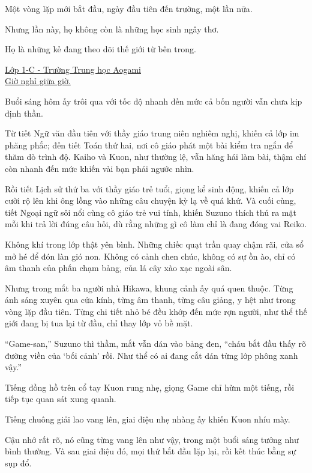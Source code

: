 \documentclass[../main.tex]{subfiles}
\begin{document}
Một vòng lặp mới bắt đầu, ngày đầu tiên đến trường, một lần nữa.

Nhưng lần này, họ không còn là những học sinh ngây thơ.

Họ là những kẻ đang theo dõi thế giới từ bên trong.

\begin{center}
  \uline{Lớp 1-C - Trường Trung học Aogami\\Giờ nghỉ giữa giờ.}
\end{center}

Buổi sáng hôm ấy trôi qua với tốc độ nhanh đến mức cả bốn người vẫn chưa kịp định thần.

Từ tiết Ngữ văn đầu tiên với thầy giáo trung niên nghiêm nghị, khiến cả lớp im phăng phắc; đến tiết Toán thứ hai, nơi cô giáo phát một bài kiểm tra ngắn để thăm dò trình độ. Kaiho và Kuon, như thường lệ, vẫn hăng hái làm bài, thậm chí còn nhanh đến mức khiến vài bạn phải ngước nhìn.

Rồi tiết Lịch sử thứ ba với thầy giáo trẻ tuổi, giọng kể sinh động, khiến cả lớp cười rộ lên khi ông lồng vào những câu chuyện kỳ lạ về quá khứ. Và cuối cùng, tiết Ngoại ngữ sôi nổi cùng cô giáo trẻ vui tính, khiến Suzuno thích thú ra mặt mỗi khi trả lời đúng câu hỏi, dù rằng những gì cô làm chỉ là đang đóng vai Reiko.

Không khí trong lớp thật yên bình. Những chiếc quạt trần quay chậm rãi, cửa sổ mở hé để đón làn gió non. Không có cảnh chen chúc, không có sự ồn ào, chỉ có âm thanh của phấn chạm bảng, của lá cây xào xạc ngoài sân.

Nhưng trong mắt ba người nhà Hikawa, khung cảnh ấy quá quen thuộc. Từng ánh sáng xuyên qua cửa kính, từng âm thanh, từng câu giảng, y hệt như trong vòng lặp đầu tiên. Từng chi tiết nhỏ bé đều khớp đến mức rợn người, như thể thế giới đang bị tua lại từ đầu, chỉ thay lớp vỏ bề mặt.

``Game-san,'' Suzuno thì thầm, mắt vẫn dán vào bảng đen, ``cháu bắt đầu thấy rõ đường viền của `bối cảnh' rồi. Như thể có ai đang cắt dán từng lớp phông xanh vậy.''

Tiếng đồng hồ trên cổ tay Kuon rung nhẹ, giọng Game chỉ hừm một tiếng, rồi tiếp tục quan sát xung quanh.

Tiếng chuông giải lao vang lên, giai điệu nhẹ nhàng ấy khiến Kuon nhíu mày.

Cậu nhớ rất rõ, nó cũng từng vang lên như vậy, trong một buổi sáng tưởng như bình thường. Và sau giai điệu đó, mọi thứ bắt đầu lặp lại, rồi kết thúc bằng sự sụp đổ.
\end{document}
